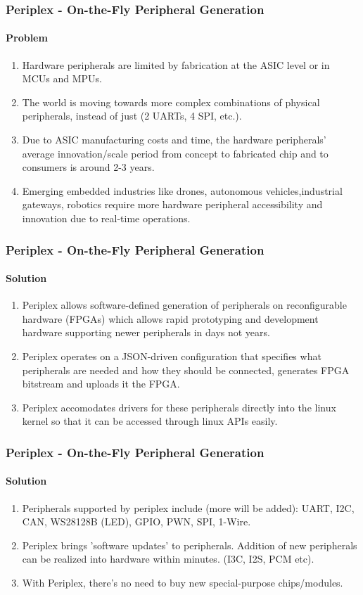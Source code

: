 \documentclass{beamer}
\begin{document}
{\begin{frame}[fragile]
  \frametitle{Periplex - On-the-Fly Peripheral Generation}
  \framesubtitle{Problem}
  \begin{enumerate}
    \item Hardware peripherals are limited by fabrication at the ASIC level or
      in MCUs and MPUs.
    \item The world is moving towards more complex combinations of physical
      peripherals, instead of just (2 UARTs, 4 SPI, etc.).
    \item Due to ASIC manufacturing costs and time, the hardware peripherals’
      average innovation/scale period from concept to fabricated chip and to
      consumers is around 2-3 years.
    \item Emerging embedded industries like drones, autonomous
  vehicles,industrial gateways, robotics require more hardware peripheral
  accessibility and innovation due to real-time operations.
  \end{enumerate}
\end{frame}


\begin{frame}[fragile]
  \frametitle{Periplex - On-the-Fly Peripheral Generation}
  \framesubtitle{Solution}
  \begin{enumerate}
    \item Periplex allows software-defined generation of peripherals on
      reconfigurable hardware (FPGAs) which allows rapid prototyping
      and development hardware supporting newer peripherals in days not years.
    \item Periplex operates on a JSON-driven configuration that specifies 
      what peripherals are needed and how they should be connected, 
      generates FPGA bitstream and uploads it the FPGA.
    \item Periplex accomodates drivers for these peripherals directly into
      the linux kernel so that it can be accessed through linux APIs easily.
  \end{enumerate}
\end{frame}

\begin{frame}[fragile]
  \frametitle{Periplex - On-the-Fly Peripheral Generation}
  \framesubtitle{Solution}
  \begin{enumerate}
     \item Peripherals supported by periplex include (more will be added):
       UART, I2C, CAN, WS28128B (LED), GPIO, PWN, SPI, 1-Wire.
     \item Periplex brings 'software updates' to peripherals. Addition of new
       peripherals can be realized into hardware within minutes. (I3C, I2S,
       PCM etc).
     \item With Periplex, there's no need to buy new special-purpose
       chips/modules.
  \end{enumerate}
\end{frame}

}
\end{document}
